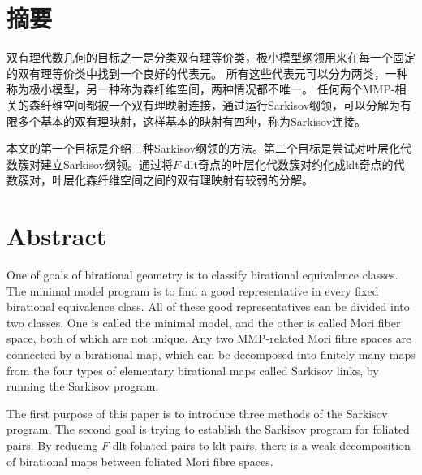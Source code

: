 

\maketitle%
\MAKETITLE%
\makedeclaration%


\intobmk\chapter*{摘\quad 要}%
\setcounter{page}{1}%

双有理代数几何的目标之一是分类双有理等价类，极小模型纲领用来在每一个固定的双有理等价类中找到一个良好的代表元。
所有这些代表元可以分为两类，一种称为极小模型，另一种称为森纤维空间，两种情况都不唯一。
任何两个MMP-相关的森纤维空间都被一个双有理映射连接，通过运行Sarkisov纲领，可以分解为有限多个基本的双有理映射，这样基本的映射有四种，称为Sarkisov连接。

本文的第一个目标是介绍三种Sarkisov纲领的方法。第二个目标是尝试对叶层化代数簇对建立Sarkisov纲领。通过将$F$-dlt奇点的叶层化代数簇对约化成klt奇点的代数簇对，叶层化森纤维空间之间的双有理映射有较弱的分解。 


\intobmk\chapter*{Abstract}%

One of goals of birational geometry is to classify birational equivalence classes. The minimal model program  is to find a good representative in every fixed birational equivalence class. 
All of these good representatives can be divided into two classes. One is called the minimal model, and the other is called Mori fiber space, both of  which are not unique. 
Any two MMP-related Mori fibre spaces are connected by a birational map, which can be decomposed into finitely many maps from the four types of elementary birational maps called Sarkisov links, by running the Sarkisov program. 

The first purpose of this paper is to introduce three methods of the Sarkisov program.
The second goal is trying to establish the Sarkisov program for foliated pairs. By reducing $F$-dlt foliated pairs to klt pairs, there is a weak decomposition of birational maps between foliated Mori fibre spaces.  


\cleardoublepage\pagestyle{frontmatterstyle}%

